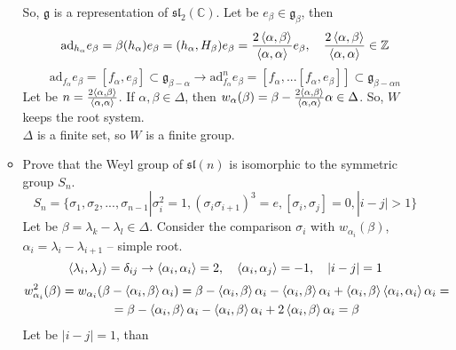 \documentclass[12pt]{article}
\theoremstyle{definition}
\begin{document}
\begin{enumerate}
\begin{itemize}
\begin{equation}
        \end{equation}
        So, $\mathfrak{g}$ is a representation of $\mathfrak{sl}_2(\mathbb{C})$. Let be $e_\beta\in\mathfrak{g}_\beta$, then
        \begin{equation}
            \text{ad}_{h_\alpha}e_\beta=\beta(h_\alpha)e_\beta=(h_\alpha,H_\beta)e_\beta=\frac{2\braket{\alpha,\beta}}{\braket{\alpha,\alpha}}e_\beta,\quad\frac{2\braket{\alpha,\beta}}{\braket{\alpha,\alpha}}\in\mathbb{Z}
        \end{equation}
        \begin{equation}
            \text{ad}_{f_\alpha}e_\beta=[f_\alpha,e_\beta]\subset\mathfrak{g}_{\beta-\alpha}\rightarrow\text{ad}^n_{f_\alpha}e_\beta=[f_\alpha,...[f_\alpha,e_\beta]]\subset\mathfrak{g}_{\beta-\alpha n}
        \end{equation}
        Let be $n=\frac{2\braket{\alpha,\beta}}{\braket{\alpha,\alpha}}$. If $\alpha,\beta\in\Delta$, then $w_\alpha(\beta)=\beta-\frac{2\braket{\alpha,\beta}}{\braket{\alpha,\alpha}}\alpha\in\Delta$. So, $W$ keeps the root system.\\
        $\Delta$ is a finite set, so $W$ is a finite group.
        \item Prove that the Weyl group of $\mathfrak{sl}(n)$ is isomorphic to the symmetric group $S_n$.
        \begin{equation}
            S_n=\{\sigma_1,\sigma_2,...,\sigma_{n-1}|\sigma_i^2=1,(\sigma_i\sigma_{i+1})^3=e,[\sigma_i,\sigma_j]=0,|i-j|>1\}
        \end{equation}
        Let be $\beta=\lambda_k-\lambda_l\in\Delta$. Consider the comparison $\sigma_i$ with $w_{\alpha_i}(\beta)$, $\alpha_i=\lambda_i-\lambda_{i+1}$ -- simple root.
        \begin{equation}
            \braket{\lambda_i,\lambda_j}=\delta_{ij}\rightarrow\braket{\alpha_i,\alpha_i}=2,\quad\braket{\alpha_i,\alpha_j}=-1,\quad|i-j|=1
        \end{equation}
        \begin{multline}
            w^2_{\alpha_i}(\beta)=w_{\alpha_i}(\beta-\braket{\alpha_i,\beta}\alpha_i)=\beta-\braket{\alpha_i,\beta}\alpha_i-\braket{\alpha_i,\beta}\alpha_i+\braket{\alpha_i,\beta}\braket{\alpha_i,\alpha_i}\alpha_i=\\=\beta-\braket{\alpha_i,\beta}\alpha_i-\braket{\alpha_i,\beta}\alpha_i+2\braket{\alpha_i,\beta}\alpha_i=\beta
        \end{multline}
        Let be $|i-j|=1$, than
        \begin{multline}

\end{multline}
\end{itemize}
\end{enumerate}
\end{document}

